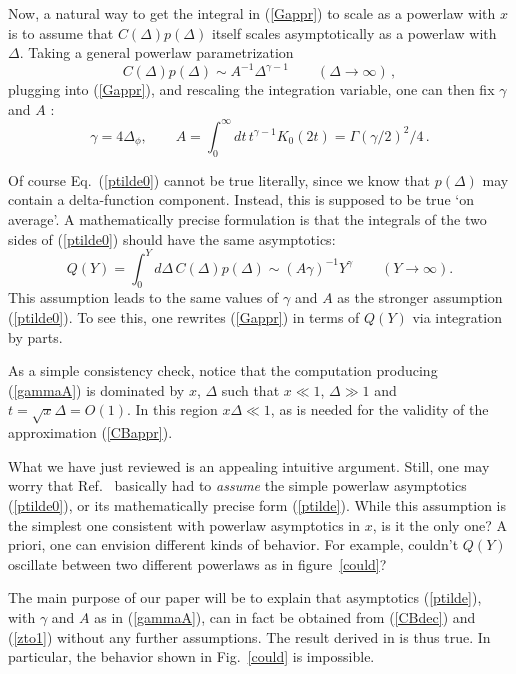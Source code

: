 \documentclass[12pt]{article}
\newcommand{\reef}[1]{(\ref{#1})}
\newcommand{\beq}{\begin{equation}}
\newcommand{\eeq}{\end{equation}}
\numberwithin{equation}{section}
\begin{document}
Now, a natural way to get the integral in \reef{Gappr} to scale as a powerlaw with $x$ is to assume that $C(\Delta)  p(\Delta)$ itself scales asymptotically as a powerlaw with $\Delta$. Taking a general powerlaw parametrization
\beq
\label{ptilde0}
C(\Delta) p(\Delta) \sim A^{-1} \Delta^{\gamma-1}\qquad(\Delta\to\infty)\,,
\eeq
plugging into \reef{Gappr}, and rescaling the integration variable, one can then fix $\gamma$ and $A$ \cite{Fitzpatrick:2012yx}:
\beq
\label{gammaA}
\gamma=4\Delta_\phi,\qquad A =\int_0^\infty dt\, t^{\gamma-1} K_0(2 t) =\Gamma(\gamma/2)^2/4\,.
\eeq

Of course Eq.~\reef{ptilde0} cannot be true literally, since we know that $p(\Delta)$ may contain a delta-function component. Instead, this is supposed to be true `on average'. A mathematically precise formulation is that the integrals of the two sides of \reef{ptilde0} should have the same asymptotics:
\beq
\label{ptilde}
Q(Y)=\int_0^Y d\Delta\,C(\Delta) p(\Delta)\sim (A\gamma)^{-1} Y^\gamma \qquad(Y \to\infty).
\eeq
This assumption leads to the same values of $\gamma$ and $A$ as the stronger assumption \reef{ptilde0}. To see this, one rewrites \reef{Gappr} in terms of $Q(Y)$ via integration by parts. 

As a simple consistency check, notice that the computation producing \reef{gammaA} is dominated by $x$, $\Delta$ such that $x\ll 1$, $\Delta\gg 1$ and $t=\sqrt{x} \Delta =O(1)$. In this region $x\Delta \ll 1$, as is needed for the validity of the approximation \reef{CBappr}. 

What we have just reviewed is an appealing intuitive argument. Still, one may worry that Ref.~\cite{Fitzpatrick:2012yx} basically had to \emph{assume} the simple powerlaw asymptotics \reef{ptilde0}, or its mathematically precise form \reef{ptilde}. While this assumption is the simplest one consistent with powerlaw asymptotics in $x$, is it the only one? A priori, one can envision different kinds of behavior. For example, couldn't $Q(Y)$ oscillate between two different powerlaws as in figure~\ref{could}? 

The main purpose of our paper will be to explain that asymptotics \reef{ptilde}, with $\gamma$ and $A$ as in \reef{gammaA}, can in fact be obtained from \reef{CBdec} and \reef{zto1} without any further assumptions. The result derived in \cite{Fitzpatrick:2012yx} is thus true. In particular, the behavior shown in Fig.~\ref{could} is impossible.
\end{document}
